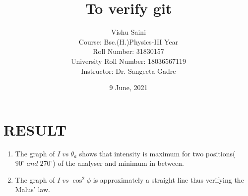 \documentclass[11pt,a4paper]{article}
\begin{document}



\title{\textbf{To verify git}}
\author{Vishu Saini\\
	Course:  Bsc.(H.)Physics-III Year\\
	Roll Number:  31830157\\			
	University Roll Number: 18036567119\\
	Instructor: Dr. Sangeeta Gadre}
\date{9 June, 2021}
\maketitle
%


%

\thispagestyle{fancy}






\section*{RESULT}
\begin{enumerate}
\item The graph of $I \; vs \; \theta_{a}$ shows that intensity is maximum for two positions( $90^{\circ} \; and\; 270^{\circ}$) of the analyser and minimum in between.
\item The graph of $I \;vs\; \cos^{2}\phi$ is approximately a straight line thus verifying the Malus' law.  
\end{enumerate}
\end{document}
